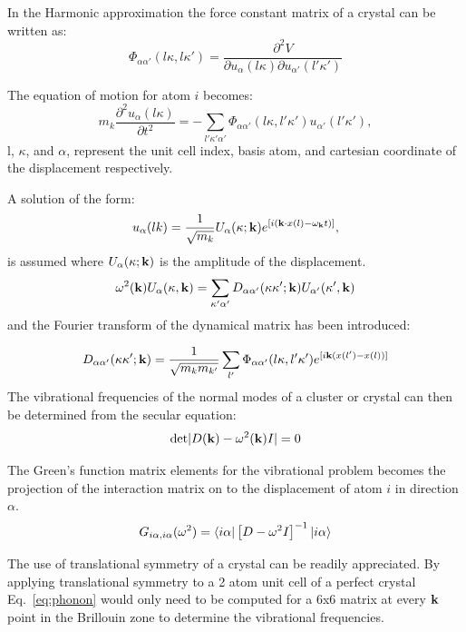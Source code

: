 In the Harmonic approximation the force constant matrix of a crystal can be written as:
%
\begin{equation}
\label{eq:forceconstant}
\Phi_{\alpha\alpha'}(l\kappa,l\kappa') = \frac{\partial^{2}V}{\partial u_{\alpha}(l\kappa) \partial u_{\alpha'}(l'\kappa')}
\end{equation}
%

The equation of motion for atom $i$ becomes:
%
\begin{equation}
m_{k} \frac{\partial^{2} u_\alpha (l\kappa)}{\partial t^{2}} = - \sum_{l'\kappa'\alpha'}
\Phi_{\alpha\alpha'}(l\kappa,l'\kappa')u_{\alpha'}(l'\kappa'),
\end{equation}
%
l, $\kappa$, and $\alpha$, represent the unit cell index, basis atom, and 
cartesian coordinate of the displacement respectively.

A solution of the form:
%
\begin{equation}
u_{\alpha}(lk) = \frac{1}{\sqrt{m_{k}}} U_{\alpha}(\kappa;{\bf k})e^{[i({\bf k}\cdot x(l) - \omega_{{\bf k}}t)]},
\end{equation}
%
is assumed where $U_{\alpha}(\kappa;{\bf k})$ is the amplitude of the displacement.
%
\begin{equation}
\omega^{2}({\bf k}) U_{\alpha}(\kappa, {\bf k}) = \sum_{\kappa'\alpha'}D_{\alpha\alpha'}(\kappa\kappa';{\bf k}) U_{\alpha'}(\kappa',{\bf k})
\end{equation}
%
and the Fourier transform of the dynamical matrix has been introduced:

\begin{equation}
D_{\alpha\alpha'}(\kappa\kappa';{\bf k}) = \frac{1}{\sqrt{m_{k}m_{k'}}} \sum_{l'} \Phi_{\alpha\alpha'}(l\kappa,l'\kappa') e^{[i{\bf k}(x(l')-x(l))]}
\end{equation}
%
The vibrational frequencies of the normal modes of a cluster or crystal can then be determined 
from the secular equation:
%
\begin{equation}
{\rm det}|D({\bf k}) - \omega^{2}({\bf k})I| = 0
\end{equation}
%

The Green's function matrix elements for the vibrational problem 
becomes the projection of the interaction matrix on to the 
displacement of atom $i$ in direction $\alpha$.
%
\begin{equation}
G_{i\alpha,i\alpha}(\omega^{2})= \langle i\alpha| \left[D- \omega^{2}I\right]^{-1} |i\alpha \rangle
\end{equation}
%

The use of translational symmetry of a crystal
can be readily appreciated. By applying translational
symmetry to a 2 atom unit cell of a perfect 
crystal Eq.~\ref{eq:phonon} would only
need to be computed for a 6x6 matrix at every ${\bf k}$ point 
in the Brillouin zone to determine the vibrational frequencies. 

